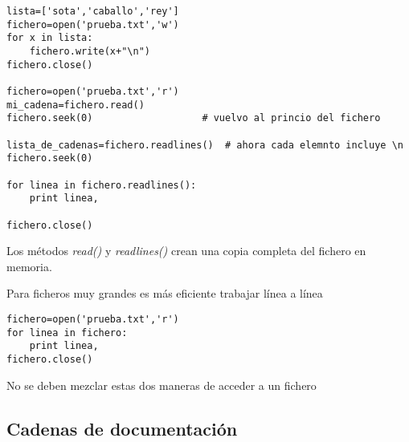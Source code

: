 \documentclass[ucs]{beamer}
\begin{document}

\begin{frame}[fragile]


  \begin{scriptsize}
  \begin{verbatim}
lista=['sota','caballo','rey']
fichero=open('prueba.txt','w')    
for x in lista:
    fichero.write(x+"\n")         
fichero.close()         
    
fichero=open('prueba.txt','r')
mi_cadena=fichero.read()
fichero.seek(0)                   # vuelvo al princio del fichero

lista_de_cadenas=fichero.readlines()  # ahora cada elemnto incluye \n
fichero.seek(0)

for linea in fichero.readlines():
    print linea,

fichero.close()
  \end{verbatim}
  \end{scriptsize}

\end{frame}


\begin{frame}[fragile]
Los métodos \emph{read()} y \emph{readlines()} crean una copia
completa del fichero en memoria.

Para ficheros muy grandes es más eficiente trabajar línea
a línea

  \begin{scriptsize}
  \begin{verbatim}
fichero=open('prueba.txt','r')
for linea in fichero:
    print linea,
fichero.close()
  \end{verbatim}
  \end{scriptsize}

No se deben mezclar estas dos maneras de acceder a un fichero

\end{frame}


\subsection{Cadenas de documentación}
\end{document}
